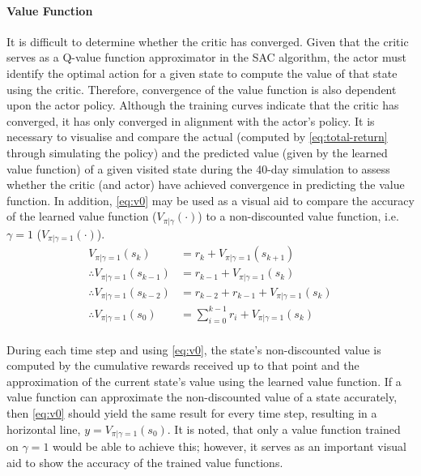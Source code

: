 \paragraph{Value Function}
It is difficult to determine whether the critic has converged. Given that the critic serves as a Q-value function approximator in the SAC algorithm, the actor must identify the optimal action for a given state to compute the value of that state using the critic. Therefore, convergence of the value function is also dependent upon the actor policy. Although the training curves indicate that the critic has converged, it has only converged in alignment with the actor’s policy. It is necessary to visualise and compare the actual (computed by \autoref{eq:total-return} through simulating the policy) and the predicted value (given by the learned value function) of a given visited state during the 40-day simulation to assess whether the critic (and actor) have achieved convergence in predicting the value function. In addition, \autoref{eq:v0} may be used as a visual aid to compare the accuracy of the learned value function ($V_{\pi|\gamma}(\cdot)$) to a non-discounted value function, i.e. $\gamma = 1$ ($V_{\pi|\gamma=1}(\cdot)$).
\begin{equation}\label{eq:v0}
	\begin{aligned}
		V_{\pi|\gamma = 1}(s_k) &= r_k + V_{\pi|\gamma = 1}(s_{k+1}) \\
		\therefore V_{\pi|\gamma = 1}(s_{k-1}) &= r_{k-1} + V_{\pi|\gamma = 1}(s_{k}) \\
		\therefore V_{\pi|\gamma = 1}(s_{k-2}) &= r_{k-2} + r_{k-1} + V_{\pi|\gamma = 1}(s_{k}) \\
		\therefore V_{\pi|\gamma = 1}(s_{0}) &= \sum_{i=0}^{k-1} {r_{i}} + V_{\pi|\gamma = 1}(s_{k})   \\
	\end{aligned}
\end{equation}

During each time step and using \autoref{eq:v0}, the state’s non-discounted value is computed by the cumulative rewards received up to that point and the approximation of the current state’s value using the learned value function. If a value function can approximate the non-discounted value of a state accurately, then \autoref{eq:v0} should yield the same result for every time step, resulting in a horizontal line, $y = V_{\pi|\gamma = 1}(s_0)$. It is noted, that only a value function trained on $\gamma = 1$ would be able to achieve this; however, it serves as an important visual aid to show the accuracy of the trained value functions.

